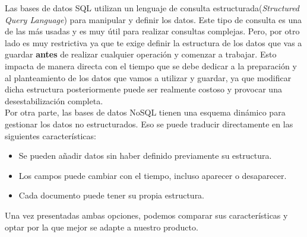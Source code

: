 Las bases de datos SQL utilizan un lenguaje de consulta estructurada(\textit{Structured Query Language}) para manipular
y definir los datos. Este tipo de consulta es una de las más usadas y es muy útil para realizar consultas complejas. 
Pero, por otro lado es muy restrictiva ya que te exige definir la estructura de los datos que vas a guardar \textbf{antes} 
de realizar cualquier operación y comenzar a trabajar. Esto impacta de manera directa con el tiempo que se debe dedicar a 
la preparación y al planteamiento de los datos que vamos a utilizar y guardar, ya que modificar dicha estructura posteriormente
puede ser realmente costoso y provocar una desestabilización completa.\\

Por otra parte, las bases de datos NoSQL tienen una esquema dinámico para gestionar los datos no estructurados. Eso se puede
traducir directamente en las siguientes características:

\begin{itemize}
	\item Se pueden añadir datos sin haber definido previamente su estructura.
	\item Los campos puede cambiar con el tiempo, incluso aparecer o desaparecer.
	\item Cada documento puede tener su propia estructura.
\end{itemize}

Una vez presentadas ambas opciones, podemos comparar sus características y optar por la que mejor se adapte a nuestro producto.

